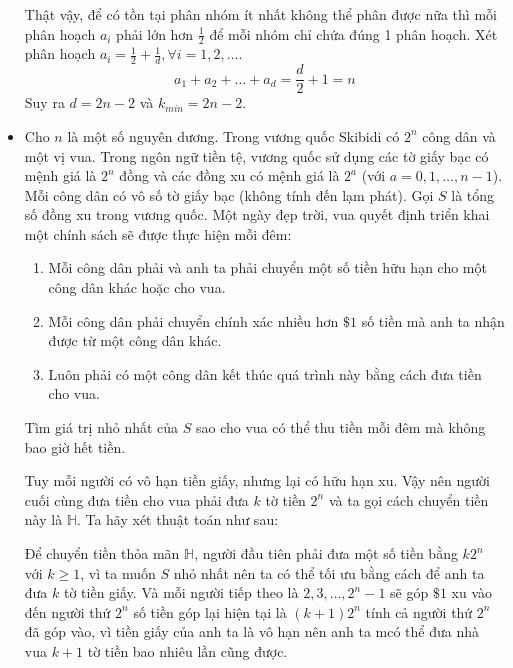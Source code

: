 \documentclass[11pt]{scrartcl}
\begin{document}
\begin{itemize}[label=, leftmargin=0em, itemsep=0.5em]
\begin{sol}
        Thật vậy, để có tồn tại phân nhóm ít nhất không thể phân được nữa thì mỗi phân hoạch $a_i$ phải lớn hơn $\frac{1}{2}$ để mỗi nhóm chỉ chứa đúng 1 phân hoạch.  Xét phân hoạch $a_i = \frac{1}{2} + \frac{1}{d}, \forall i = 1,2,\dots$.
        \[
        a_1 + a_2 + \dots + a_d = \frac{d}{2} + 1 = n
        \]
        Suy ra $d = 2n - 2$ và $k_{min} = 2n - 2$.
    \end{sol}

    
    \item\begin{bt}
        Cho $n$ là một số nguyên dương. Trong vương quốc Skibidi có $2^n$ công dân và một vị vua. Trong ngôn ngữ tiền tệ, vương quốc sử dụng các tờ giấy bạc có mệnh giá là $2^n$ đồng và các đồng xu có mệnh giá là $2^a$ (với $a=0,1,\ldots,n-1$). Mỗi công dân có vô số tờ giấy bạc (không tính đến lạm phát). Gọi $S$ là tổng số đồng xu trong vương quốc. Một ngày đẹp trời, vua quyết định triển khai một chính sách sẽ được thực hiện mỗi đêm:
        \begin{enumerate}
            \item Mỗi công dân phải và anh ta phải chuyển một số tiền hữu hạn cho một công dân khác hoặc cho vua.
            \item Mỗi công dân phải chuyển chính xác nhiều hơn $\$1$ số tiền mà anh ta nhận được từ một công dân khác. 
            \item Luôn phải có một công dân kết thúc quá trình này bằng cách đưa tiền cho vua.
        \end{enumerate}

        Tìm giá trị nhỏ nhất của $S$ sao cho vua có thể thu tiền mỗi đêm mà không bao giờ hết tiền.
    \end{bt}

    \begin{sol}
        Tuy mỗi người có vô hạn tiền giấy, nhưng lại có hữu hạn xu. Vậy nên người cuối cùng đưa tiền cho vua phải đưa $k$ tờ tiền $2^n$ và ta gọi cách chuyển tiền này là $\mathbb{H}$. Ta hãy xét thuật toán như sau:

        Để chuyển tiền thỏa mãn $\mathbb{H}$, người đầu tiên phải đưa một số tiền bằng $k2^n$ với $k \geq 1$, vì ta muốn $S$ nhỏ nhất nên ta có thể tối ưu bằng cách để anh ta đưa $k$ tờ tiền giấy. Và mỗi người tiếp theo là $2,3,\dots,2^{n} - 1$ sẽ góp $\$1$ xu vào đến người thứ $2^n$ số tiền góp lại hiện tại là $(k + 1)2^n$ tính cả người thứ $2^n$ đã góp vào, vì tiền giấy của anh ta là vô hạn nên anh ta mcó thể đưa nhà vua $k + 1$ tờ tiền bao nhiêu lần cũng được.



\end{sol}
\end{itemize}
\end{document}
